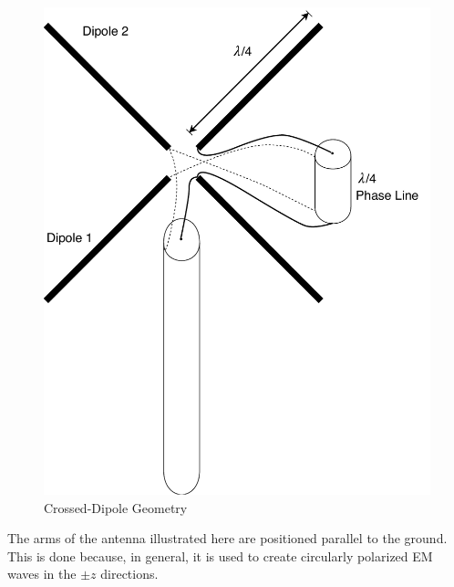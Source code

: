 \documentclass[11pt]{witseiepaper}
\begin{document}
\begin{center}
    \begin{figure}
        \includegraphics[width=\textwidth]{Crossed-Dipole.pdf}
        \caption{Crossed-Dipole Geometry}
        \label{fig:Crossed-DipoleGeometry}    
    \end{figure}
\end{center}

The arms of the antenna illustrated here are positioned parallel to the ground. This is done because, in general, it is used to create circularly polarized EM waves in the $\pm z$ directions.
\end{document}
